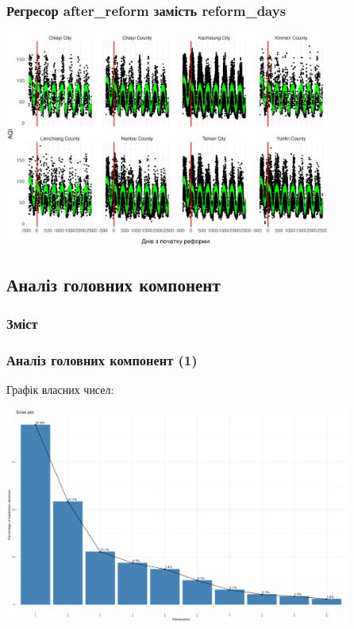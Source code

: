 \documentclass{beamer}
\begin{document}
\begin{frame}
\frametitle{Регресор after\_reform замість reform\_days}
  \includegraphics[height=2.8in]{plots/lab4/partial_linear/nppl_w_after_reform.png}
\end{frame}

\begin{frame}
  \section{Аналіз головних компонент}

  \frametitle{Зміст}
  \tableofcontents[currentsection]
\end{frame}

\begin{frame}
\frametitle{Аналіз головних компонент (1)}
  Графік власних чисел:

  \includegraphics[height=2.8in]{plots/lab4/pca/scree.png}
\end{frame}
\end{document}
